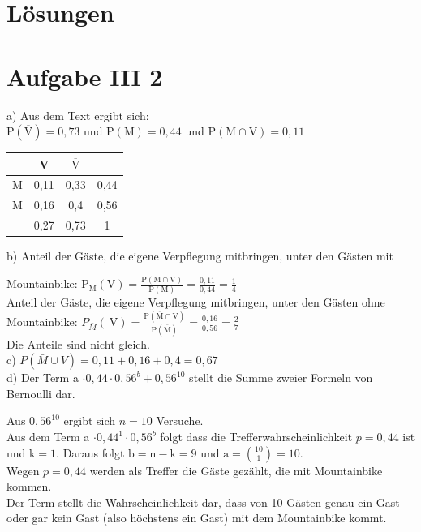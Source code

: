 \documentclass[10pt]{article}
\begin{document}
\section*{Lösungen}
\section*{Aufgabe III 2}
a) Aus dem Text ergibt sich:\\
$\mathrm{P}(\overline{\mathrm{V}})=0,73$ und $\mathrm{P}(\mathrm{M})=0,44$ und $\mathrm{P}(\mathrm{M} \cap \mathrm{V})=0,11$

\begin{center}
\begin{tabular}{|c|c|c|c|}
\hline
 & V & $\overline{\mathrm{V}}$ &  \\
\hline
M & 0,11 & 0,33 & 0,44 \\
\hline
$\overline{\mathrm{M}}$ & 0,16 & 0,4 & 0,56 \\
\hline
 & 0,27 & 0,73 & 1 \\
\hline
\end{tabular}
\end{center}

b) Anteil der Gäste, die eigene Verpflegung mitbringen, unter den Gästen mit

Mountainbike: $\mathrm{P}_{\mathrm{M}}(\mathrm{V})=\frac{\mathrm{P}(\mathrm{M} \cap \mathrm{V})}{\mathrm{P}(\mathrm{M})}=\frac{0,11}{0,44}=\frac{1}{4}$\\
Anteil der Gäste, die eigene Verpflegung mitbringen, unter den Gästen ohne\\
Mountainbike: $P_{\bar{M}}(\mathrm{~V})=\frac{\mathrm{P}(\overline{\mathrm{M}} \cap \mathrm{V})}{\mathrm{P}(\overline{\mathrm{M}})}=\frac{0,16}{0,56}=\frac{2}{7}$\\
Die Anteile sind nicht gleich.\\
c) $P(\bar{M} \cup V)=0,11+0,16+0,4=0,67$\\
d) Der Term a $\cdot 0,44 \cdot 0,56^{b}+0,56^{10}$ stellt die Summe zweier Formeln von Bernoulli dar.

Aus $0,56^{10}$ ergibt sich $n=10$ Versuche.\\
Aus dem Term a $\cdot 0,44^{1} \cdot 0,56^{b}$ folgt dass die Trefferwahrscheinlichkeit $p=0,44$ ist und $\mathrm{k}=1$. Daraus folgt $\mathrm{b}=\mathrm{n}-\mathrm{k}=9$ und $\mathrm{a}=\binom{10}{1}=10$.\\
Wegen $p=0,44$ werden als Treffer die Gäste gezählt, die mit Mountainbike kommen.\\
Der Term stellt die Wahrscheinlichkeit dar, dass von 10 Gästen genau ein Gast oder gar kein Gast (also höchstens ein Gast) mit dem Mountainbike kommt.
\end{document}
